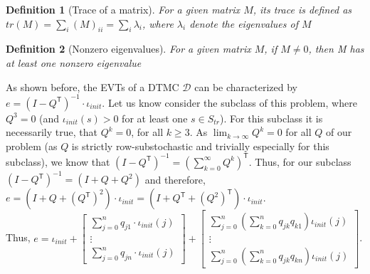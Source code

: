 \documentclass[journal,compsoc,10pt]{IEEEtran}
\newcommand{\MC}{\mathcal{D}} %
\newcommand{\T}{\mathsf{T}}            %
\newtheorem{definition}{Definition}[section]
\begin{document}
\begin{definition}[Trace of a matrix]\label{def:trace_of_matrix}
    For a given matrix $M$, its trace is defined as $tr(M) = \sum_i (M)_{ii} = \sum_i \lambda_i$, where $\lambda_i$ denote the eigenvalues of $M$
\end{definition}

\begin{definition}[Nonzero eigenvalues]\label{def:nonzero_eigenvalues_of_matrix}
    For a given matrix $M$, if $M\neq 0$, then M has at least one nonzero eigenvalue
\end{definition}


As shown before, the EVTs of a DTMC $\MC$ can be characterized by $e = (I-Q^\T)^{-1}\cdot \iota_{init}$. Let us know consider the subclass of this problem, where $Q^3 = 0$ (and $\iota_{init}(s)>0$ for at least one $s\in S_{tr}$). For this subclass it is necessarily true, that $Q^k = 0$, for all $k\geq 3$. As $\lim_{k\rightarrow\infty}Q^k=0$ for all $Q$ of our problem (as $Q$ is strictly row-substochastic and trivially especially for this subclass), we know that $(I-Q^\T)^{-1} = (\sum_{k=0}^\infty Q^k)^\T$. Thus, for our subclass $(I-Q^\T)^{-1} = (I + Q + Q^2)$ and therefore, $e = (I+Q+(Q^\T)^2)\cdot \iota_{init} = (I+Q^\T+(Q^2)^\T)\cdot \iota_{init}$.\\
Thus, $e = \iota_{init}
+\begin{bmatrix}
    \sum_{j=0}^n q_{j1}\cdot \iota_{init}(j)\\
    \vdots\\
    \sum_{j=0}^n q_{jn}\cdot \iota_{init}(j)
\end{bmatrix}
+\begin{bmatrix}
    \sum_{j=0}^n (\sum_{k=0}^n q_{jk}q_{k1})\iota_{init}(j)\\
    \vdots\\
    \sum_{j=0}^n (\sum_{k=0}^n q_{jk}q_{kn})\iota_{init}(j)
\end{bmatrix}$. 
\end{document}
